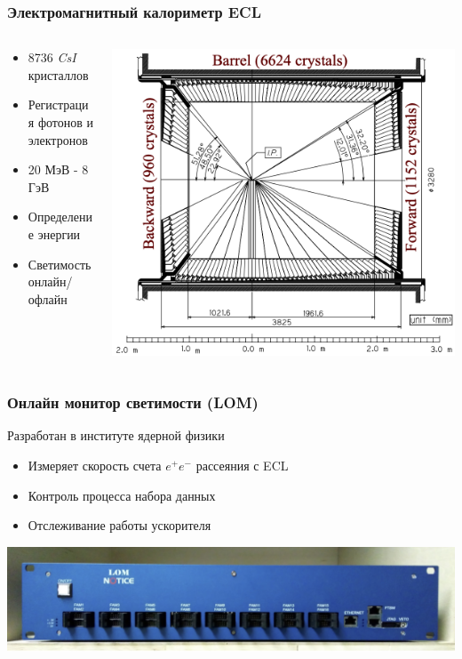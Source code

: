 \documentclass{beamer}
\begin{document}
\begin{frame}
\frametitle{Электромагнитный калориметр ECL}
    \begin{columns}
        \begin{column}{0.5\textwidth}
            \begin{itemize}
                \item 8736 \textit{CsI} кристаллов
                \item Регистрация фотонов и электронов
                \item 20 МэВ - 8 ГэВ
                \item Определение энергии
                \item Светимость онлайн/офлайн
            \end{itemize}
        \end{column}
        \begin{column}{0.5\textwidth}
            \includegraphics[width=\textwidth]{ECL}
        \end{column}
    \end{columns}
\end{frame}

\begin{frame}
\frametitle{Онлайн монитор светимости (LOM)}
Разработан в институте ядерной физики
    \begin{itemize}
        \item Измеряет скорость счета $e^+e^-$ рассеяния с ECL
        \item Контроль процесса набора данных
        \item Отслеживание работы ускорителя
    \end{itemize}
    \includegraphics[width=\textwidth]{LOM_picture}
\end{frame}
\end{document}

